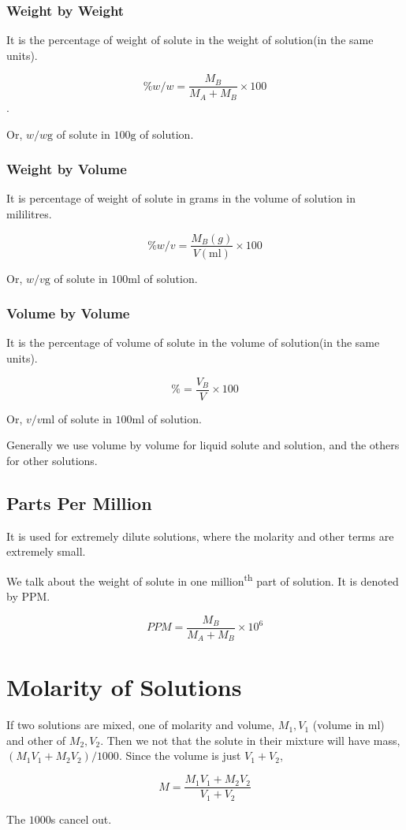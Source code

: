 \subsubsection{Weight by Weight}

It is the percentage of weight of solute in the weight of solution(in the same units).

\[ \% w/w = \frac{M_B}{M_A + M_B} \times 100\].

Or, \(w/w \si{\g}\) of solute in \(100 \si{\g}\) of solution.

\subsubsection{Weight by Volume}

It is percentage of weight of solute in grams in the volume of solution in mililitres.

\[ \% w/v = \frac{M_B(\si{g})}{V(\si{\ml})} \times 100\]

Or, \(w/v \si{\g}\) of solute in \(100 \si{\ml}\) of solution.

\subsubsection{Volume by Volume}

It is the percentage of volume of solute in the volume of solution(in the same units).

\[ \% = \frac{V_B}{V} \times 100\]

Or, \(v/v \si{\ml}\) of solute in \(100 \si{\ml}\) of solution.

Generally we use volume by volume for liquid solute and solution, and the others
for other solutions. 

\subsection{Parts Per Million}

It is used for extremely dilute solutions, where the molarity and other terms
are extremely small.

We talk about the weight of solute in one million\textsuperscript{th} part of solution.
It is denoted by PPM. 

\begin{equation}
  PPM = \frac{M_B}{M_A + M_B} \times 10^6
\end{equation}

\section{Molarity of Solutions}

If two solutions are mixed, one of molarity and volume, \(M_1, V_1\) (volume 
in \si{\ml}) and other 
of \(M_2, V_2\). Then we not that the solute in their mixture 
will have mass, \((M_1V_1 + M_2V_2)/1000\). Since the volume 
is just \(V_1+V_2\), 

\begin{equation}
  M = \frac{M_1V_1 + M_2V_2}{V_1 + V_2}
\end{equation}

The \(1000\)s cancel out.